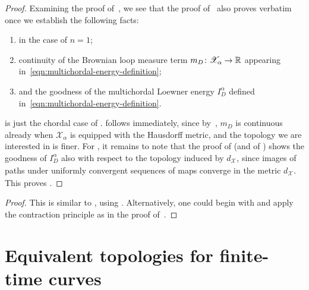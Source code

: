 \documentclass[a4paper, 11pt]{article}
\theoremstyle{definition}
\numberwithin{equation}{section}
\numberwithin{figure}{section}
\newcommand{\mcenergy}[2]{I_{#1}^{#2}}
\newcommand{\Hpaths}[1][]{\mathscr{X}_{#1}} %
\newcommand{\dHpaths}[1][]{d_{\!\Hpaths[#1]}}
\newcommand{\loopterm}[1]{m_{#1}}
\begin{document}
\multichordalLDP*

\begin{proof}
Examining the proof of~\cite[Theorem~1.5]{Peltola-Wang:LDP}, we see that the proof of~\cite[Theorem~5.11]{Peltola-Wang:LDP} also proves  verbatim once we establish the following facts: 
\begin{enumerate}[leftmargin=*, label=\textnormal{(\roman*)}]
\item \label{item_multi1}
 in the case of $n=1$; 

\item \label{item_multi2}
continuity of the Brownian loop measure term $\loopterm{D} \colon \Hpaths[\alpha] \to \bR$ appearing in~\eqref{eqn:multichordal-energy-definition}; 

\item \label{item_multi3}
and the goodness of the multichordal Loewner energy $\mcenergy{D}{\alpha}$ defined in~\eqref{eqn:multichordal-energy-definition}. 
\end{enumerate}
 is just the chordal case of . 
 follows immediately, since by~\cite[Lemma~3.2]{Peltola-Wang:LDP}, 
$\loopterm{D}$ is continuous already when $\Hpaths[\alpha]$ is equipped with the Hausdorff metric,
and the topology we are interested in is finer. 
For , it remains to note that the proof of \cite[Proposition~3.13]{Peltola-Wang:LDP} (and of \cite[Lemma~2.7]{Peltola-Wang:LDP})
shows the goodness of $\mcenergy{D}{\alpha}$ also with respect to the topology induced by $\dHpaths$, 
since images of paths under uniformly convergent sequences of maps converge in the metric $\dHpaths$.
This proves .
\end{proof}

\multichordalLDPunparam* 

\begin{proof}
This is similar to , using .
Alternatively, one could begin with   and apply the contraction principle as in the proof of~.
\end{proof}%

\newpage

\appendix

\section{Equivalent topologies for finite-time curves}
\label{app:lemma_topo}
\topology*
\end{document}
